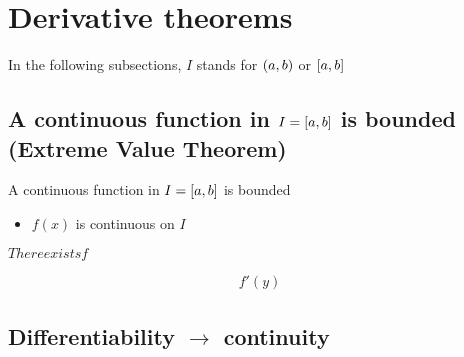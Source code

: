 

\section{Derivative theorems}
In the following subsections, $I$ stands for $(a,b)$ or $\left[a,b \right]$

\subsection{A continuous function in $I=\left[a,b \right]$ is bounded (Extreme Value Theorem)}

\begin{property}{A continuous function in $I=\left[a,b \right]$ is bounded}
\begin{precondition}
\begin{itemize}
    \item $f(x)$  is continuous on $I$
\end{itemize}
\end{precondition}
\begin{claim}
    $There exists f$
\end{claim}
\begin{Proof}

\begin{align*}
f'(y)
\end{align*}
\end{Proof}
\end{property}

\newcommand{\xz}{x_0}
\subsection{Differentiability $→$ continuity}

